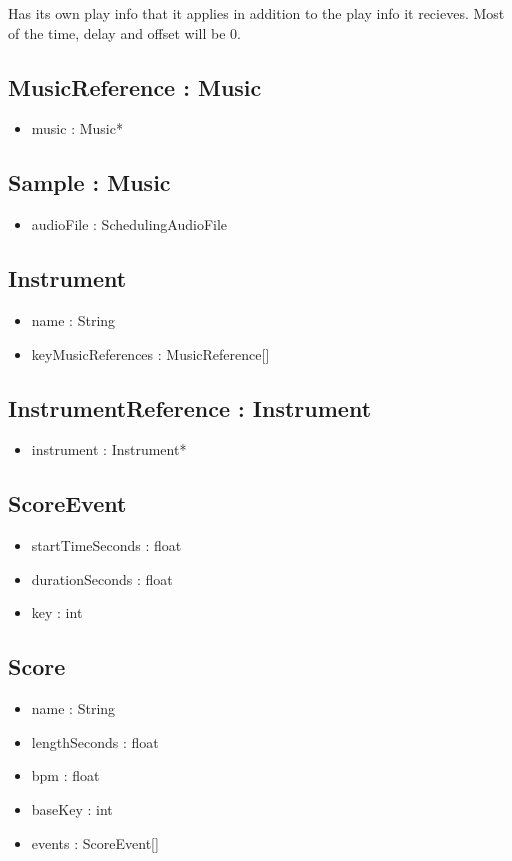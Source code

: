 \documentclass[12pt]{article}
\begin{document}
Has its own play info that it applies in addition to the play info it recieves. Most of the time, delay and offset will be 0.

\subsection*{MusicReference : Music}
\begin{itemize}
\item music : Music*
\end{itemize}

\subsection*{Sample : Music}
\begin{itemize}
\item audioFile : SchedulingAudioFile
\end{itemize}

\subsection*{Instrument}
\begin{itemize}
\item name : String
\item keyMusicReferences : MusicReference[]
\end{itemize}

\subsection*{InstrumentReference : Instrument}
\begin{itemize}
\item instrument : Instrument*
\end{itemize}

\subsection*{ScoreEvent}
\begin{itemize}
\item startTimeSeconds : float
\item durationSeconds : float
\item key : int
\end{itemize}

\subsection*{Score}
\begin{itemize}
\item name : String
\item lengthSeconds : float
\item bpm : float
\item baseKey : int
\item events : ScoreEvent[]
\end{itemize}
\end{document}
